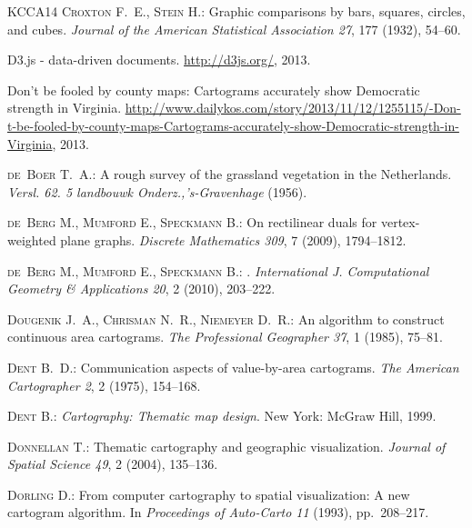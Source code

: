 \documentclass{egpubl}
\begin{document}
\begin{thebibliography}{\uppercase{KCCA{\etalchar{*}}14}}
\textsc{Croxton F.~E., Stein H.}:
\newblock Graphic comparisons by bars, squares, circles, and cubes.
\newblock \emph{Journal of the American Statistical Association 27}, 177
  (1932), 54--60.

D3.js - data-driven documents.
\newblock \url{http://d3js.org/}, 2013.

Don't be fooled by county maps: Cartograms accurately show {Democratic strength
  in Virginia}.
\newblock
  \url{http://www.dailykos.com/story/2013/11/12/1255115/-Don-t-be-fooled-by-county-maps-Cartograms-accurately-show-Democratic-strength-in-Virginia},
  2013.

\textsc{de~Boer T.~A.}:
\newblock A rough survey of the grassland vegetation in the {Netherlands}.
\newblock \emph{Versl. 62. 5 landbouwk Onderz.,'s-Gravenhage} (1956).

\textsc{de~Berg M., Mumford E., Speckmann B.}:
\newblock On rectilinear duals for vertex-weighted plane graphs.
\newblock \emph{Discrete Mathematics 309}, 7 (2009), 1794--1812.

\textsc{de~Berg M., Mumford E., Speckmann B.}:
.
\newblock \emph{International J. Computational Geometry \& Applications 20}, 2
  (2010), 203--222.

\textsc{Dougenik J.~A., Chrisman N.~R., Niemeyer D.~R.}:
\newblock An algorithm to construct continuous area cartograms.
\newblock \emph{The Professional Geographer 37}, 1 (1985), 75--81.

\textsc{Dent B.~D.}:
\newblock Communication aspects of value-by-area cartograms.
\newblock \emph{The American Cartographer 2}, 2 (1975), 154--168.

\textsc{Dent B.}:
\newblock \emph{Cartography: Thematic map design}.
\newblock New York: McGraw Hill, 1999.

\textsc{Donnellan T.}:
\newblock Thematic cartography and geographic visualization.
\newblock \emph{Journal of Spatial Science 49}, 2 (2004), 135--136.

\textsc{Dorling D.}:
\newblock From computer cartography to spatial visualization: A new cartogram
  algorithm.
\newblock In \emph{Proceedings of Auto-Carto 11} (1993), pp.~208--217.


\end{thebibliography}
\end{document}
